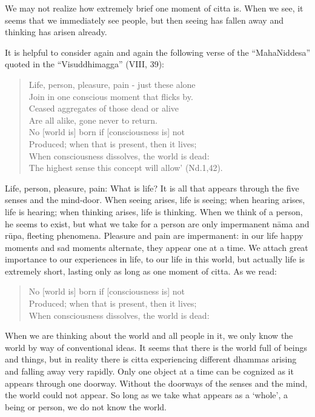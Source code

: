 We may not realize how extremely brief one moment of citta is. When we see, 
it seems that we immediately see people, but then seeing has fallen away and 
thinking has arisen already. 

It is helpful to consider again and again the following verse of the ``MahaNiddesa'' quoted in the ``Visuddhimagga'' (VIII, 39): 

\begin{verse}

Life, person, pleasure, pain - just these alone\\ 
Join in one conscious moment that flicks by.\\ 
Ceased aggregates of those dead or alive\\
Are all alike, gone never to return. \\
No [world is] born if [consciousness is] not \\
Produced; when that is present, then it lives;\\ 
When consciousness dissolves, the world is dead:\\ 
The highest sense this concept will allow' (Nd.1,42). 
\end{verse}

Life, person, pleasure, pain: What is life? It is all that appears through the five 
senses and the mind-door. When seeing arises, life is seeing; when hearing arises, life is hearing; when thinking arises, life is thinking. When we think of a 
person, he seems to exist, but what we take for a person are only impermanent 
nāma and rūpa, fleeting phenomena. Pleasure and pain are impermanent: in our 
life happy moments and sad moments alternate, they appear one at a time. We 
attach great importance to our experiences in life, to our life in this world, but 
actually life is extremely short, lasting only as long as one moment of citta. 
As we read:
\begin{verse}
No [world is] born if [consciousness is] not \\
Produced; when that is present, then it lives;\\ 
When consciousness dissolves, the world is dead:\\  
\end{verse}

When we are thinking about the world and all people in it, we only know the 
world by way of conventional ideas. It seems that there is the world full of beings and things, but in reality there is citta experiencing different dhammas arising and falling away very rapidly. Only one object at a time can be cognized as 
it appears through one doorway. Without the doorways of the senses and the 
mind, the world could not appear. So long as we take what appears as a `whole', 
a being or person, we do not know the world. 

